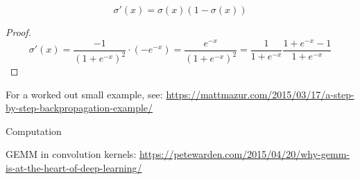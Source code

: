 \begin{lemma}
  \label{lemma:sigma-prime}
  \[ \sigma'(x) = \sigma(x)(1-\sigma(x)) \]
\end{lemma}
\begin{proof}
  \[
  \sigma'(x)=\frac{-1}{ (1+e^{-x})^2 }\cdot (-e^{-x})
  = \frac{e^{-x}}{ (1+e^{-x})^2 }
  = \frac{1}{ 1+e^{-x} } \frac{1+e^{-x}-1}{ 1+e^{-x} }
  \]
\end{proof}

For a worked out small example, see: \url{https://mattmazur.com/2015/03/17/a-step-by-step-backpropagation-example/}

 {Computation}

GEMM in convolution kernels:
\url{https://petewarden.com/2015/04/20/why-gemm-is-at-the-heart-of-deep-learning/}
